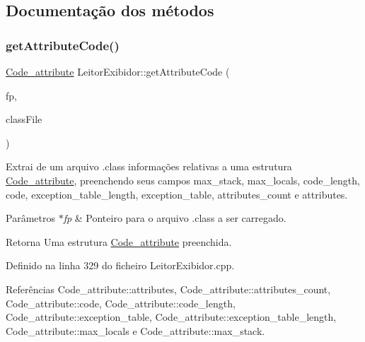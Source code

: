 \subsection{Documentação dos métodos}
\mbox{\label{classLeitorExibidor_a3ebd90beea3ea327aa7d22b84357c4d0}} 
\subsubsection{\texorpdfstring{get\+Attribute\+Code()}{getAttributeCode()}}
{\footnotesize\ttfamily \hyperlink{structCode__attribute}{Code\+\_\+attribute} Leitor\+Exibidor\+::get\+Attribute\+Code (\begin{DoxyParamCaption}\item[{F\+I\+LE $\ast$}]{fp,  }\item[{\hyperlink{classClassFile}{Class\+File} $\ast$}]{class\+File }\end{DoxyParamCaption})\hspace{0.3cm}{\ttfamily [private]}}

Extrai de um arquivo .class informações relativas a uma estrutura \hyperlink{structCode__attribute}{Code\+\_\+attribute}, preenchendo seus campos max\+\_\+stack, max\+\_\+locals, code\+\_\+length, code, exception\+\_\+table\+\_\+length, exception\+\_\+table, attributes\+\_\+count e attributes. 
\begin{DoxyParams}{Parâmetros}
{\em $\ast$fp} & Ponteiro para o arquivo .class a ser carregado. \\
\hline
\end{DoxyParams}
\begin{DoxyReturn}{Retorna}
Uma estrutura \hyperlink{structCode__attribute}{Code\+\_\+attribute} preenchida. 
\end{DoxyReturn}


Definido na linha 329 do ficheiro Leitor\+Exibidor.\+cpp.



Referências Code\+\_\+attribute\+::attributes, Code\+\_\+attribute\+::attributes\+\_\+count, Code\+\_\+attribute\+::code, Code\+\_\+attribute\+::code\+\_\+length, Code\+\_\+attribute\+::exception\+\_\+table, Code\+\_\+attribute\+::exception\+\_\+table\+\_\+length, Code\+\_\+attribute\+::max\+\_\+locals e Code\+\_\+attribute\+::max\+\_\+stack.


